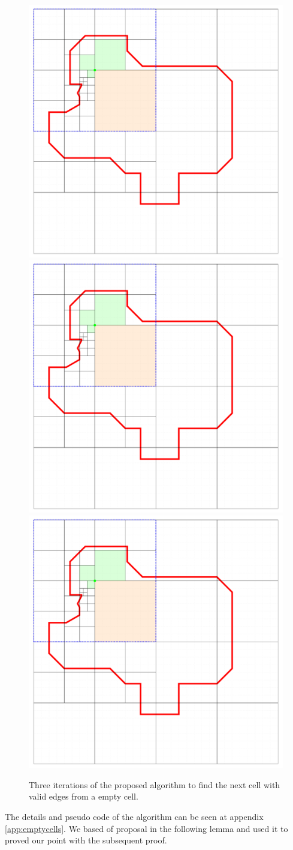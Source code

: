 \begin{figure}[!ht]
    \centering
    \includegraphics[page=1, width=0.49\linewidth]{figures/cellinpolygon/example}
    \includegraphics[page=2, width=0.49\linewidth]{figures/cellinpolygon/example}
    \includegraphics[page=3, width=0.49\linewidth]{figures/cellinpolygon/example}
    \caption{Three iterations of the proposed algorithm to find the next cell with valid edges from a empty cell.} \label{fig:emptycellexample}
\end{figure}

The details and pseudo code of the algorithm can be seen at appendix \ref{app:emptycells}.  We based of proposal in the following lemma and used it to proved our point with the subsequent proof.

